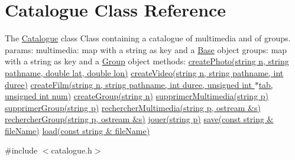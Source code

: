 \hypertarget{classCatalogue}{\section{Catalogue Class Reference}
\label{classCatalogue}
}


The \hyperlink{classCatalogue}{Catalogue} class Class containing a catalogue of multimedia and of groups. params\-: multimedia\-: map with a string as key and a \hyperlink{classBase}{Base} object groups\-: map with a string as key and a \hyperlink{classGroup}{Group} object methods\-: \hyperlink{classCatalogue_aba54aa202119c2184dc18e5278f3ae59}{create\-Photo(string n, string pathname, double lat, double lon)} \hyperlink{classCatalogue_a59e7c173b7b7b889bb531a9b1048119e}{create\-Video(string n, string pathname, int duree)} \hyperlink{classCatalogue_aeea731bce1425a52589a46f80af016c5}{create\-Film(string n, string pathname, int duree, unsigned int $\ast$tab, unsigned int num)} \hyperlink{classCatalogue_a9e834d56a00f43b03f598a5459966d00}{create\-Group(string n)} \hyperlink{classCatalogue_a88a9f6dcfac06d9a1eed7331ab3b1f40}{supprimer\-Multimedia(string p)} \hyperlink{classCatalogue_a1839ba57f687e559fcf0251a6841624b}{supprimer\-Group(string p)} \hyperlink{classCatalogue_a07fb093b33ce5fc95af3ea8874aeef97}{rechercher\-Multimedia(string p, ostream \&s)} \hyperlink{classCatalogue_ae033231c07cc7f5fd751a4c8d25ab8e5}{rechercher\-Group(string p, ostream \&s)} \hyperlink{classCatalogue_acb117d10f869d108f142cf38811f7022}{jouer(string p)} \hyperlink{classCatalogue_a47134c107bbda909706188dc759bc076}{save(const string \& file\-Name)} \hyperlink{classCatalogue_a9bba7adb9d7455f04b9cfc839c8ebd93}{load(const string \& file\-Name)}  




{\ttfamily \#include $<$catalogue.\-h$>$}

